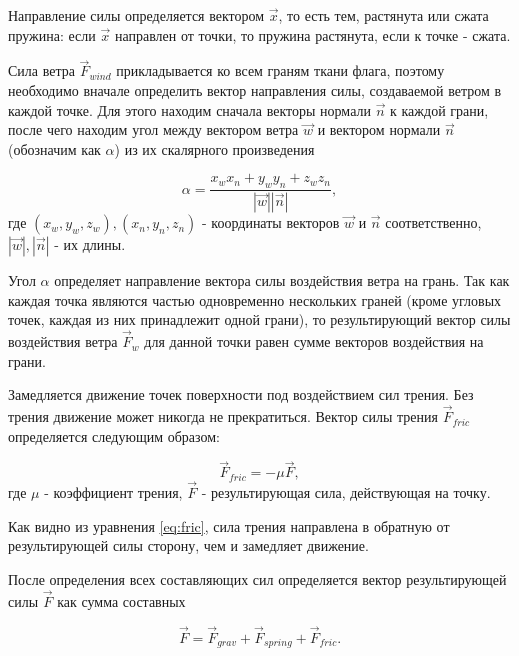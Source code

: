 \vspace{0.3cm}Направление силы определяется вектором $\vec{x}$, то есть тем, растянута или сжата пружина: если $\vec{x}$ направлен от точки, то пружина растянута, если к точке - сжата.

\vspace{0.3cm}Сила ветра $\vec{F}_{wind}$ прикладывается ко всем граням ткани флага, поэтому необходимо вначале определить вектор направления силы, создаваемой ветром в каждой точке. Для этого находим сначала векторы нормали $\vec{n}$ к каждой грани, после чего находим угол между вектором ветра $\vec{w}$ и вектором нормали $\vec{n}$ (обозначим как $\alpha$) из их скалярного произведения

\begin{equation}
\displaystyle \alpha = \frac{x_{w}x_{n}+y_{w}y_{n}+z_{w}z_{n}}{|\vec{w}||\vec{n}|} ,
\end{equation}
где $(x_{w},y_{w},z_{w}), (x_{n},y_{n},z_{n})$ - координаты векторов $\vec{w}$ и $\vec{n}$ соответственно,
$|\vec{w}|,|\vec{n}|$ - их длины.

\vspace{0.3cm}Угол $\alpha$ определяет направление вектора силы воздействия ветра на грань. Так как каждая точка являются частью одновременно нескольких граней (кроме угловых точек, каждая из них принадлежит одной грани), то результирующий вектор силы воздействия ветра $\vec{F}_{w}$ для данной точки равен сумме векторов воздействия на грани.

\vspace{0.3cm}Замедляется движение точек поверхности под воздействием сил трения. Без трения движение может никогда не прекратиться. Вектор силы трения $\vec{F}_{fric}$ определяется следующим образом:

\begin{equation}
\vec{F}_{fric} = -\mu\vec{F},
\label{eq:fric}
\end{equation}
где $\mu$ - коэффициент трения, $\vec{F}$ - результирующая сила, действующая на точку.

Как видно из уравнения \ref{eq:fric}, сила трения направлена в обратную от результирующей силы сторону, чем и замедляет движение.

\vspace{0.3cm}После определения всех составляющих сил определяется вектор результирующей силы $\vec{F}$ как сумма составных

\begin{equation}
\vec{F} = \vec{F}_{grav} + \vec{F}_{spring} + \vec{F}_{fric}.
\end{equation}


